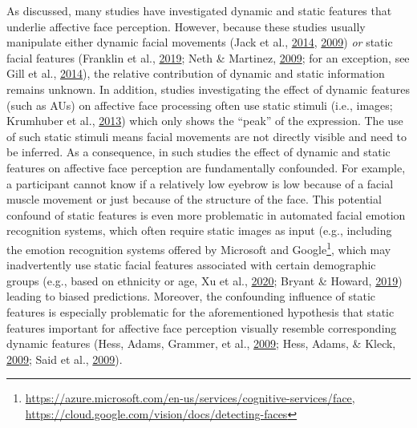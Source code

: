 \documentclass[11pt,american,]{memoir} %
\let\rmarkdownfootnote\footnote%
\def\footnote{\protect\rmarkdownfootnote}
\begin{document}
As discussed, many studies have investigated dynamic and static features that underlie affective face perception. However, because these studies usually manipulate either dynamic facial movements (Jack et al., \protect\hyperlink{ref-Jack2014-ku}{2014}, \protect\hyperlink{ref-Jack2009-yy}{2009}) \emph{or} static facial features (Franklin et al., \protect\hyperlink{ref-Franklin2019-qo}{2019}; Neth \& Martinez, \protect\hyperlink{ref-Neth2009-eh}{2009}; for an exception, see Gill et al., \protect\hyperlink{ref-Gill2014-hx}{2014}), the relative contribution of dynamic and static information remains unknown. In addition, studies investigating the effect of dynamic features (such as AUs) on affective face processing often use static stimuli (i.e., images; Krumhuber et al., \protect\hyperlink{ref-Krumhuber2013-qi}{2013}) which only shows the ``peak'' of the expression. The use of such static stimuli means facial movements are not directly visible and need to be inferred. As a consequence, in such studies the effect of dynamic and static features on affective face perception are fundamentally confounded. For example, a participant cannot know if a relatively low eyebrow is low because of a facial muscle movement or just because of the structure of the face. This potential confound of static features is even more problematic in automated facial emotion recognition systems, which often require static images as input (e.g., including the emotion recognition systems offered by Microsoft and Google\footnote{\url{https://azure.microsoft.com/en-us/services/cognitive-services/face}, \url{https://cloud.google.com/vision/docs/detecting-faces}}, which may inadvertently use static facial features associated with certain demographic groups (e.g., based on ethnicity or age, Xu et al., \protect\hyperlink{ref-Xu2020-jd}{2020}; Bryant \& Howard, \protect\hyperlink{ref-Bryant2019-sg}{2019}) leading to biased predictions. Moreover, the confounding influence of static features is especially problematic for the aforementioned hypothesis that static features important for affective face perception visually resemble corresponding dynamic features (Hess, Adams, Grammer, et al., \protect\hyperlink{ref-Hess2009-jz}{2009}; Hess, Adams, \& Kleck, \protect\hyperlink{ref-Hess2009-xo}{2009}; Said et al., \protect\hyperlink{ref-Said2009-tf}{2009}).
\end{document}
